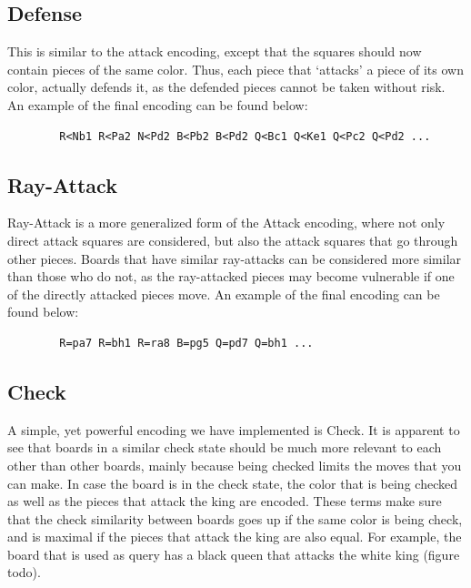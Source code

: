 \documentclass[11pt]{article}
\begin{document}
    \subsection{Defense}

    This is similar to the attack encoding, except that the squares should now contain pieces of the same color. Thus, each piece that `attacks' a piece of its own color, actually defends it, as the defended pieces cannot be taken without risk. An example of the final encoding can be found below:

    \begin{verbatim}
        R<Nb1 R<Pa2 N<Pd2 B<Pb2 B<Pd2 Q<Bc1 Q<Ke1 Q<Pc2 Q<Pd2 ...
    \end{verbatim}

    \subsection{Ray-Attack}

    Ray-Attack is a more generalized form of the Attack encoding, where not only direct attack squares are considered, but also the attack squares that go through other pieces. Boards that have similar ray-attacks can be considered more similar than those who do not, as the ray-attacked pieces may become vulnerable if one of the directly attacked pieces move. An example of the final encoding can be found below:

     \begin{verbatim}
        R=pa7 R=bh1 R=ra8 B=pg5 Q=pd7 Q=bh1 ...
    \end{verbatim}

    \subsection{Check}

    A simple, yet powerful encoding we have implemented is Check. It is apparent to see that boards in a similar check state should be much more relevant to each other than other boards, mainly because being checked limits the moves that you can make. In case the board is in the check state, the color that is being checked as well as the pieces that attack the king are encoded. These terms make sure that the check similarity between boards goes up if the same color is being check, and is maximal if the pieces that attack the king are also equal. For example, the board that is used as query has a black queen that attacks the white king (figure todo).
\end{document}
